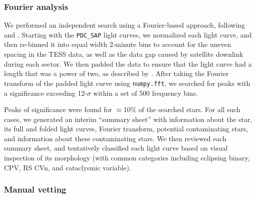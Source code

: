 \documentclass[11pt,twocolumn,tighten]{aastex63}
\begin{document}
\subsubsection{Fourier analysis}
\label{subsec:fourier}

We performed an independent search using a Fourier-based approach,
following \citet{2019ApJ...876..127Z} and \citet[][their
Section~1.3]{2023MNRAS.524.4220P}.  Starting with the {\tt PDC\_SAP}
light curves, we normalized each light curve, and then re-binned it
into equal width 2-minute bins to account for the uneven spacing in
the TESS data, as well as the data gap caused by satellite downlink
during each sector.  We then padded the data to ensure that the light
curve had a length that was a power of two, as described by
\citeauthor{2019ApJ...876..127Z}.  After taking the Fourier transform
of the padded light curve using {\tt numpy.fft}, we searched for peaks
with a significance exceeding 12-$\sigma$ within a set of 500
frequency bins.

Peaks of significance were found for $\approx$10\% of the searched
stars.  For all such cases, we generated an interim ``summary sheet''
with information about the star, its full and folded light curves,
Fourier transform, potential contaminating stars, and information
about these contaminating stars.  We then reviewed each summary sheet,
and tentatively classified each light curve based on visual inspection
of its morphology (with common categories including eclipsing binary,
CPV, RS CVn, and cataclysmic variable).



\subsubsection{Manual vetting}
\label{subsec:visual}
\end{document}
